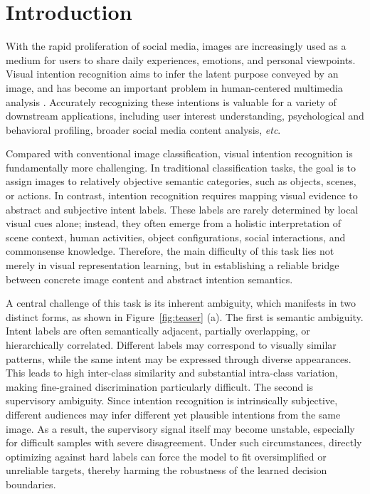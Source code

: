 \section{Introduction}
\label{sec:intro}

With the rapid proliferation of social media, images are increasingly used as a medium for users to share daily experiences, emotions, and personal viewpoints. 
Visual intention recognition aims to infer the latent purpose conveyed by an image, and has become an important problem in human-centered multimedia analysis \cite{jia_intentonomy_2021, wen_dip_2023}. 
Accurately recognizing these intentions is valuable for a variety of downstream applications, including user interest understanding, psychological and behavioral profiling, broader social media content analysis, \textit{etc}.

Compared with conventional image classification, visual intention recognition is fundamentally more challenging.
In traditional classification tasks, the goal is to assign images to relatively objective semantic categories, such as objects, scenes, or actions. 
In contrast, intention recognition requires mapping visual evidence to abstract and subjective intent labels.
These labels are rarely determined by local visual cues alone; instead, they often emerge from a holistic interpretation of scene context, human activities, object configurations, social interactions, and commonsense knowledge.
Therefore, the main difficulty of this task lies not merely in visual representation learning, but in establishing a reliable bridge between concrete image content and abstract intention semantics.

A central challenge of this task is its inherent ambiguity, which manifests in two distinct forms, as shown in Figure~\ref{fig:teaser} (a).
The first is semantic ambiguity. 
Intent labels are often semantically adjacent, partially overlapping, or hierarchically correlated. 
Different labels may correspond to visually similar patterns, while the same intent may be expressed through diverse appearances. 
This leads to high inter-class similarity and substantial intra-class variation, making fine-grained discrimination particularly difficult.
The second is supervisory ambiguity. 
Since intention recognition is intrinsically subjective, different audiences may infer different yet plausible intentions from the same image. 
As a result, the supervisory signal itself may become unstable, especially for difficult samples with severe disagreement. 
Under such circumstances, directly optimizing against hard labels can force the model to fit oversimplified or unreliable targets, thereby harming the robustness of the learned decision boundaries.

